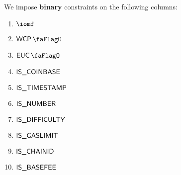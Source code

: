 We impose \textbf{binary} constraints on the following columns:
\begin{multicols}{4}
	\begin{enumerate}
		\item $\iomf$
		\item $\wcpFlag$
		\item $\eucFlag$
		\item $\textsf{IS\_COINBASE}$
		\item $\textsf{IS\_TIMESTAMP}$
		\item $\textsf{IS\_NUMBER}$
		\item $\textsf{IS\_DIFFICULTY}$
		\item $\textsf{IS\_GASLIMIT}$
		\item $\textsf{IS\_CHAINID}$
		\item $\textsf{IS\_BASEFEE}$
	\end{enumerate}
\end{multicols}
